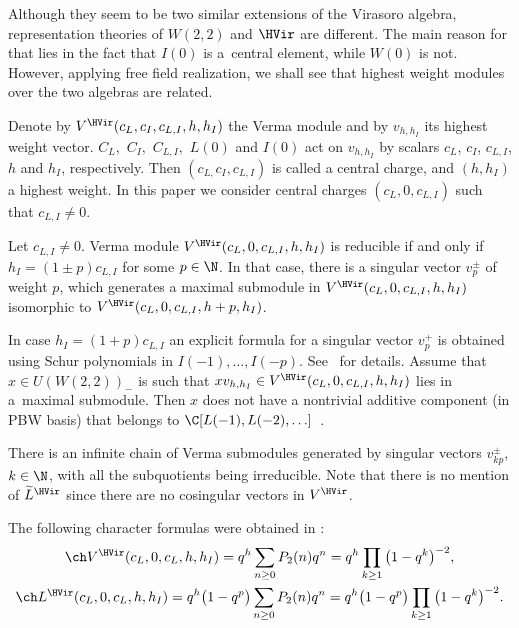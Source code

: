 Although they seem to be two similar extensions of the Virasoro algebra, representation theories of $W(2,2)$ and $\HVir$ are dif\/ferent. The main reason for that lies in the fact that $I(0) $ is a~central element, while $W(0) $ is not. However, applying free f\/ield realization, we shall see that highest weight modules over the two algebras are related.

Denote by $V^{\HVir} ( c_{L},c_{I},c_{L,I},h,h_{I} ) $ the Verma module and by $v_{h,h_I}$ its highest weight vector. $C_{L},$ $C_{I},$ $C_{L,I},$ $L(0) $ and $I(0) $ act on $v_{h,h_I}$ by scalars $c_{L}$, $c_{I}$, $c_{L,I}$, $h$ and $h_{I}$, respectively. Then $\left(c_{L,}c_{I},c_{L,I}\right) $ is called a central charge, and $(h,h_{I}) $ a highest weight. In this paper we consider central charges $(c_{L},0,c_{L,I}) $ such that $c_{L,I}\neq0$.

\begin{Theorem}\label{billig}
Let $c_{L,I}\neq0$. Verma module $V^{\HVir}(c_{L},0,c_{L,I},h,h_{I}) $ is reducible if and only if $h_{I}=(1\pm p) c_{L,I}$ for some $p\in\N$. In that case, there is a singular vector $v_p^{\pm}$ of weight $p$, which generates a maximal submodule in $V^{\HVir} ( c_{L},0,c_{L,I},h,h_{I} ) $ isomorphic to $V^{\HVir} ( c_{L},0,c_{L,I},h+p,h_{I} ) $.
\end{Theorem}

\begin{Remark} \label{kompon}
In case $h_{I}=(1+p) c_{L,I}$ an explicit formula for a singular vector $v_p^+$ is obtained using Schur polynomials in $I(-1), \ldots, I(-p)$. See~\cite{nas} for details. Assume that $x \in U(W(2,2))_-$ is such that $xv_{h,h_I} \in V^{\HVir} ( c_{L},0,c_{L,I},h,h_{I} ) $ lies in a~maximal submodule. Then $x$ does not have a nontrivial additive component (in PBW basis) that belongs to $\C [ L(-1) ,L(-2), \ldots ]$~\cite{Billig}.
\end{Remark}

There is an inf\/inite chain of Verma submodules generated by singular vectors $v_{kp}^{\pm}$, $k\in\N$, with all the subquotients being irreducible. Note that there is no mention of $\widetilde{L}^{\HVir}$ since there are no cosingular vectors in $V^{\HVir}$.

The following character formulas were obtained in \cite{Billig}:
\begin{gather*}
\ch V^{\HVir}( c_{L},0,c_{L},h,h_{I}) =q^{h}\sum_{n\geq0}P_{2}(n)q^{n}=q^{h}\prod\limits_{k\geq1}\big(1-q^{k}\big)^{-2}, \\
\ch L^{\HVir} ( c_{L},0,c_{L},h,h_{I} ) =q^{h}\big(1-q^{p}\big)\sum_{n\geq0}P_{2}(n)q^{n} =q^{h}\big(1-q^{p}\big)\prod\limits_{k\geq1}\big(1-q^{k}\big)^{-2}.
\end{gather*}

